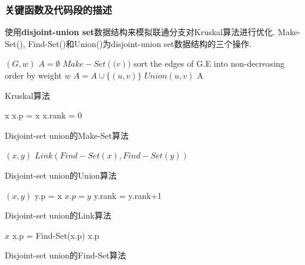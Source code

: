 \subsubsection{关键函数及代码段的描述}
使用\textbf{disjoint-union set}数据结构来模拟联通分支对Kruskal算法进行优化. Make-Set(),
Find-Set()和Union()为disjoint-union set数据结构的三个操作.
\begin{algorithm}
	\begin{algorithmic}{1}
		\Require $(G,w)$
		\State $A = \emptyset$
		\State $Make-Set(\mathit(v))$
		sort the edges of G.E into non-decreasing order by weight $\mathit{w}$
		\EndFor
		\State $A = A\cup \{(\mathit{u,v})\}$
		\State $Union(\mathit{u,v})$
		\EndIf
		\EndFor
		\return A
	\end{algorithmic}
	\caption{Kruskal算法}
\end{algorithm}

\begin{algorithm}
	\begin{algorithmic}{1}
		\Require x
		\State x.p = x
		\State x.rank = 0
	\end{algorithmic}
	\caption{Disjoint-set union的Make-Set算法}
\end{algorithm}

\begin{algorithm}
	\begin{algorithmic}{1}
		\Require $(x, y)$
		\State $Link(Find-Set(x), Find-Set(y))$
	\end{algorithmic}
	\caption{Disjoint-set union的Union算法}
\end{algorithm}

\begin{algorithm}
	\begin{algorithmic}{1}
		\Require $(x, y)$
		\State y.p = x
		\Else $x.p = y$
		y.rank = y.rank+1
		\EndIf
		\EndIf
	\end{algorithmic}
	\caption{Disjoint-set union的Link算法}
\end{algorithm}

\begin{algorithm}
	\begin{algorithmic}{1}
		\Require $x$
		\State x.p = Find-Set(x.p)
		\EndIf
		\Return x.p
	\end{algorithmic}
	\caption{Disjoint-set union的Find-Set算法}
\end{algorithm}

